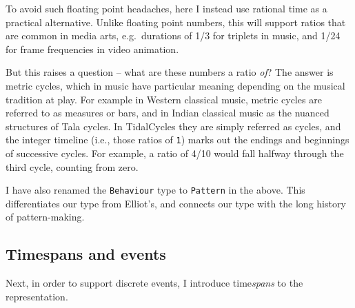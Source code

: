 To avoid such floating point headaches, here I instead use rational time
as a practical alternative. Unlike floating point numbers, this will
support ratios that are common in media arts, e.g.~durations of 1/3 for
triplets in music, and 1/24 for frame frequencies in video animation.

\begin{Shaded}
\begin{Highlighting}[]
  \OtherTok{=} 
 \OtherTok{=}  \OtherTok{{-}\textgreater{}}\NormalTok{ [a]}
\end{Highlighting}
\end{Shaded}

But this raises a question -- what are these numbers a ratio \emph{of}?
The answer is metric cycles, which in music have particular meaning
depending on the musical tradition at play. For example in Western
classical music, metric cycles are referred to as measures or bars, and
in Indian classical music as the nuanced structures of Tala cycles. In
TidalCycles they are simply referred as cycles, and the integer timeline
(i.e., those ratios of \texttt{1}) marks out the endings and beginnings
of successive cycles. For example, a ratio of 4/10 would fall halfway
through the third cycle, counting from zero.

I have also renamed the \texttt{Behaviour} type to \texttt{Pattern} in
the above. This differentiates our type from Elliot's, and connects our
type with the long history of pattern-making.

\subsection{Timespans and events}\label{timespans-and-events}

Next, in order to support discrete events, I introduce time\emph{spans}
to the representation.

\begin{Shaded}
\begin{Highlighting}[]
  \OtherTok{=} \NormalTok{ \{} \NormalTok{,} \NormalTok{\}}
 \OtherTok{=} \NormalTok{ \{} \NormalTok{,}
 \OtherTok{=}  \OtherTok{{-}\textgreater{}}\NormalTok{ [}\NormalTok{ a]}
\end{Highlighting}
\end{Shaded}

